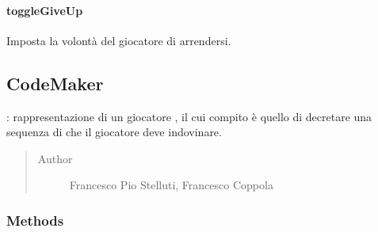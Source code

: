 \documentclass[letterpaper,10pt,italian,openany,oneside]{sphinxmanual}
\begin{document}
\paragraph{toggleGiveUp}
\label{\detokenize{source/it/unicam/cs/pa/mastermind/players/CodeBreaker:togglegiveup}}

\begin{fulllineitems}
\label{\detokenize{source/it/unicam/cs/pa/mastermind/players/CodeBreaker:it.unicam.cs.pa.mastermind.players.CodeBreaker.toggleGiveUp()}}
Imposta la volontà del giocatore  di arrendersi.

\end{fulllineitems}



\subsection{CodeMaker}
\label{\detokenize{source/it/unicam/cs/pa/mastermind/players/CodeMaker:codemaker}}\label{\detokenize{source/it/unicam/cs/pa/mastermind/players/CodeMaker::doc}}

\begin{fulllineitems}
\label{\detokenize{source/it/unicam/cs/pa/mastermind/players/CodeMaker:it.unicam.cs.pa.mastermind.players.CodeMaker}}
: rappresentazione di un giocatore , il cui compito è quello di decretare una sequenza di  che il giocatore  deve indovinare.
\begin{quote}\begin{description}
\item[{Author}] \leavevmode
Francesco Pio Stelluti, Francesco Coppola

\end{description}\end{quote}

\end{fulllineitems}



\subsubsection{Methods}
\label{\detokenize{source/it/unicam/cs/pa/mastermind/players/CodeMaker:methods}}
\end{document}
